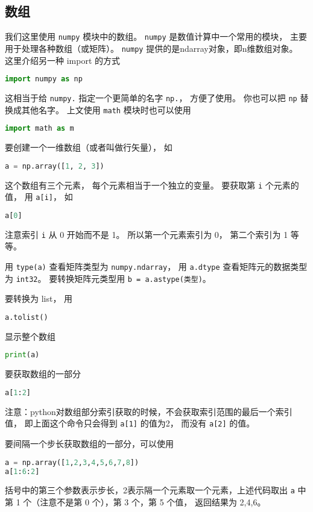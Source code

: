 

\subsection{数组}
我们这里使用 \verb|numpy| 模块中的数组。 \verb|numpy| 是数值计算中一个常用的模块， 主要用于处理各种数组（或矩阵）。 \verb|numpy| 提供的是ndarray对象，即n维数组对象。 这里介绍另一种 import 的方式
\begin{lstlisting}[language=python]
import numpy as np
\end{lstlisting}
这相当于给 \verb|numpy.| 指定一个更简单的名字 \verb|np.|， 方便了使用。 你也可以把 \verb|np| 替换成其他名字。 上文使用 \verb|math| 模块时也可以使用
\begin{lstlisting}[language=python]
import math as m
\end{lstlisting}

要创建一个一维数组（或者叫做行矢量）， 如
\begin{lstlisting}[language=python]
a = np.array([1, 2, 3])
\end{lstlisting}
这个数组有三个元素， 每个元素相当于一个独立的变量。 要获取第 \verb|i| 个元素的值， 用 \verb|a[i]|， 如
\begin{lstlisting}[language=python]
a[0]
\end{lstlisting}
注意索引 \verb|i| 从 0 开始而不是 1。 所以第一个元素索引为 0， 第二个索引为 1 等等。

用 \verb|type(a)| 查看矩阵类型为 \verb|numpy.ndarray|， 用 \verb|a.dtype| 查看矩阵元的数据类型为 \verb|int32|。 要转换矩阵元类型用 \verb|b = a.astype(类型)|。

要转换为 list， 用
\begin{lstlisting}[language=python]
a.tolist()
\end{lstlisting}

显示整个数组
\begin{lstlisting}[language=python]
print(a)
\end{lstlisting}
要获取数组的一部分
\begin{lstlisting}[language=python]
a[1:2]
\end{lstlisting}
注意：python对数组部分索引获取的时候，不会获取索引范围的最后一个索引值， 即上面这个命令只会得到 \verb|a[1]| 的值为2， 而没有 \verb|a[2]| 的值。

要间隔一个步长获取数组的一部分，可以使用
\begin{lstlisting}[language=python]
a = np.array([1,2,3,4,5,6,7,8])
a[1:6:2]
\end{lstlisting}
括号中的第三个参数表示步长，2表示隔一个元素取一个元素，上述代码取出 \verb|a| 中第 1 个（注意不是第 0 个），第  3 个，第 5 个值， 返回结果为 2,4,6。

